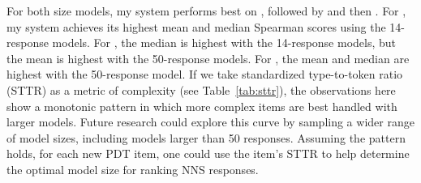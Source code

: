 For both size models, my system performs best on , followed by  and then . For , my system achieves its highest mean and median Spearman scores using the 14-response models. For , the median is highest with the 14-response models, but the mean is highest with the 50-response models. For , the mean and median are highest with the 50-response model. If we take standardized type-to-token ratio (STTR) as a metric of complexity (see Table~\ref{tab:sttr}), the observations here show a monotonic pattern in which more complex items are best handled with larger models. Future research could explore this curve by sampling a wider range of model sizes, including models larger than 50 responses. Assuming the pattern holds, for each new PDT item, one could use the item's STTR to help determine the optimal model size for ranking NNS responses.



